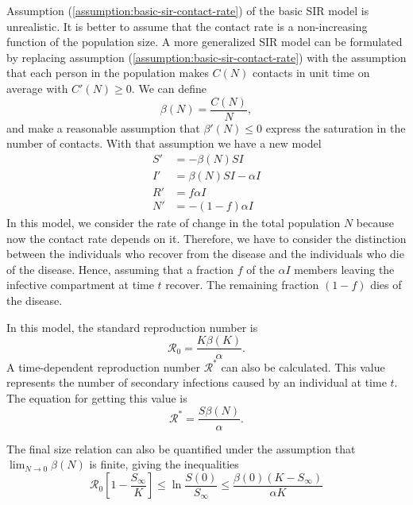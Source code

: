 Assumption (\ref{assumption:basic-sir-contact-rate}) of the basic SIR model is unrealistic.
It is better to assume that the contact rate is a non-increasing function of the population size.
A more generalized SIR model can be formulated by replacing assumption (\ref{assumption:basic-sir-contact-rate}) with the assumption that each person in the population makes $C(N)$ contacts in unit time on average with $C'(N) \geq 0$.
We can define
\begin{equation}
    \beta(N) = \frac{C(N)}{N},
\end{equation}
and make a reasonable assumption that $\beta'(N) \leq 0$ express the saturation in the number of contacts.
With that assumption we have a new model
\begin{align}
    S' &= - \beta(N)SI \nonumber \\
    I' &= \beta(N)SI - \alpha I \nonumber \\
    R' &= f \alpha I \nonumber \\
    N' &= - (1 - f) \alpha I
\end{align}
In this model, we consider the rate of change in the total population $N$ because now the contact rate depends on it.
Therefore, we have to consider the distinction between the individuals who recover from the disease and the individuals who die of the disease.
Hence, assuming that a fraction $f$ of the $\alpha I$ members leaving the infective compartment at time $t$ recover.
The remaining fraction $(1 - f)$ dies of the disease.

In this model, the standard reproduction number is
\begin{equation}
    \mathcal{R}_0 = \frac{K\beta(K)}{\alpha}.
    \label{eq:generalized-sir-r0}
\end{equation}
A time-dependent reproduction number $\mathcal{R}^*$ can also be calculated.
This value represents the number of secondary infections caused by an individual at time $t$.
The equation for getting this value is
\begin{equation}
    \mathcal{R}^* = \frac{S\beta(N)}{\alpha}.
\end{equation}

The final size relation can also be quantified under the assumption that $\lim_{N \to 0} \beta(N)$ is finite, giving the inequalities
\begin{equation}
    \mathcal{R}_0 \left[ 1 - \frac{S_\infty}{K} \right] \leq \ln\frac{S(0)}{S_\infty} \leq \frac{\beta(0)(K - S_\infty)}{\alpha K}
\end{equation}

